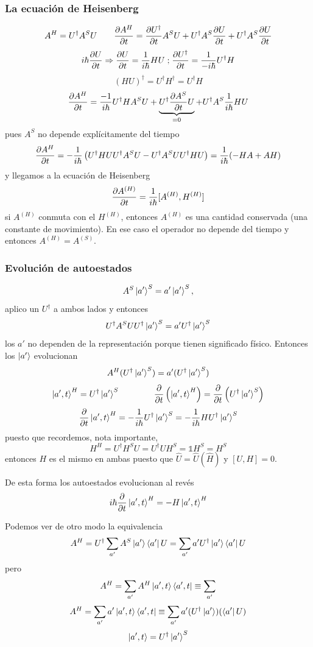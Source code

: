 \documentclass[10pt,oneside]{CBFT_book}
\begin{document}
\subsubsection{La ecuación de Heisenberg}

\[
	A^H = U^\dagger A^S U \qquad \frac{\partial^{\hspace{-0.05em}} {A^H}}{\partial {t}^{\hspace{-0.05em}}} = \frac{\partial^{\hspace{-0.05em}} {U^\dagger}}{\partial {t}^{\hspace{-0.05em}}}A^S U + U^\dagger A^S \frac{\partial^{\hspace{-0.05em}} {U}}{\partial {t}^{\hspace{-0.05em}}} +
	U^\dagger A^S \frac{\partial^{\hspace{-0.05em}} {U}}{\partial {t}^{\hspace{-0.05em}}}
\]
\[
	i\hbar \frac{\partial^{\hspace{-0.05em}} {U}}{\partial {t}^{\hspace{-0.05em}}} \Rightarrow  \frac{\partial^{\hspace{-0.05em}} {U}}{\partial {t}^{\hspace{-0.05em}}} = \frac{1}{i\hbar}HU \; \text{;} \;
	\frac{\partial^{\hspace{-0.05em}} {U^\dagger}}{\partial {t}^{\hspace{-0.05em}}} = \frac{1}{-i\hbar}U^\dagger H
\]
\[
	(HU)^\dagger = U^\dagger H^\dagger = U^\dagger H 
\]
\[
	\frac{\partial^{\hspace{-0.05em}} {A^H}}{\partial {t}^{\hspace{-0.05em}}} = \frac{-1}{i\hbar} U^\dagger H A^S U + \underbrace{U^\dagger\frac{\partial^{\hspace{-0.05em}} {A^S}}{\partial {t}^{\hspace{-0.05em}}} U}_{=0} +
	U^\dagger A^S \frac{1}{i\hbar} H U
\]
pues $A^S$ no depende explícitamente del tiempo
\[
	\frac{\partial^{\hspace{-0.05em}} {A^H}}{\partial {t}^{\hspace{-0.05em}}} = -\frac{1}{i\hbar} \left( U^\dagger HUU^\dagger A^SU -U^\dagger A^S U U^\dagger 
	HU \right) =	\frac{1}{i\hbar}(-HA + AH)
\]
y llegamos a la ecuación de Heisenberg
\[
	\frac{\partial^{\hspace{-0.05em}} {A^{(H)}}}{\partial {t}^{\hspace{-0.05em}}} = \frac{1}{i\hbar} [ A^{(H)}, H^{(H)}]
\]
si $A^{(H)}$ conmuta con el $H^{(H)}$, entonces $A^{(H)}$ es una cantidad conservada (una constante de movimiento).
En ese caso el operador no depende del tiempo y entonces $A^{(H)} = A^{(S)}$.

\subsubsection{Evolución de autoestados}

\[
	A^S \Ket{a'}^S = a' \Ket{a'}^S,
\]
aplico un $U^\dagger$ a ambos lados y entonces 
\[
	U^\dagger A^S UU^\dagger \Ket{a'}^S = a' U^\dagger \Ket{a'}^S
\]
los $a'$ no dependen de la representación porque tienen significado físico. Entonces los $\Ket{a'}$ evolucionan
\[
	A^H (U^\dagger\Ket{a'}^S) = a' (U^\dagger\Ket{a'}^S)
\]
\[
	\Ket{a',t}^H = U^\dagger \Ket{a'}^S \qquad \qquad \frac{\partial^{\hspace{-0.05em}} {}}{\partial {t}^{\hspace{-0.05em}}}\left( \Ket{a',t}^H \right) = 
	\frac{\partial^{\hspace{-0.05em}} {}}{\partial {t}^{\hspace{-0.05em}}} \left( U^\dagger \Ket{a'}^S \right)
\]
\[
	\frac{\partial^{\hspace{-0.05em}} {}}{\partial {t}^{\hspace{-0.05em}}}\Ket{a',t}^H = -\frac{1}{i\hbar} U^\dagger \Ket{a'}^S =  -\frac{1}{i\hbar} H U^\dagger 
	\Ket{a'}^S
\]
puesto que recordemos, nota importante,
\[
	H^H = U^\dagger H^S U = U^\dagger U H^S = \mathbb{1}H^S = H^S
\]
entonces $H$ es el mismo en ambas puesto que $\hat{U} =\hat{U}(\hat{H})$ y $[U,H]=0$.

De esta forma los autoestados evolucionan al revés 
\[
	i\hbar \frac{\partial^{\hspace{-0.05em}} {}}{\partial {t}^{\hspace{-0.05em}}} \Ket{a',t}^H = -H\Ket{a',t}^H
\]

Podemos ver de otro modo la equivalencia
\[
	A^H = U^\dagger \sum_{a'} A^S \Ket{a'}\Bra{a'}U = 
	\sum_{a'} a'U^\dagger \Ket{a'}\Bra{a'}U
\]
pero 
\[
	A^H = \sum_{a'} A^H \Ket{a',t}\Bra{a',t} \equiv \sum_{a'}
\]
\[
	A^H = \sum_{a'} a' \Ket{a',t}\Bra{a',t} \equiv \sum_{a'} a'(U^\dagger\Ket{a'})(\Bra{a'}U)
\]
\[
	\Ket{a',t} = U^\dagger\Ket{a'}^S
\]
\end{document}
